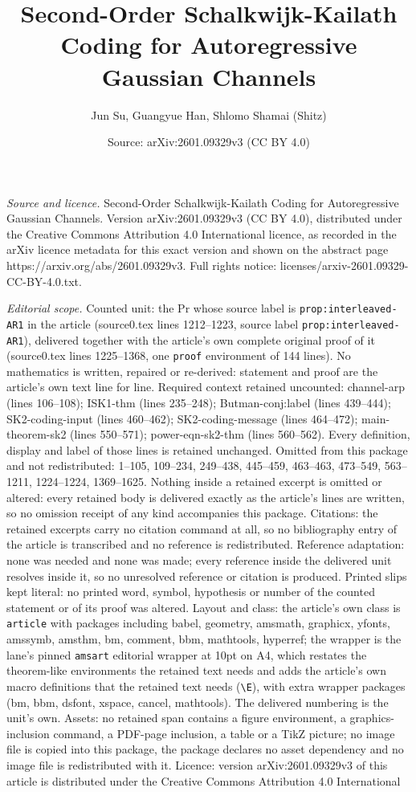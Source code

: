 \documentclass[10pt,a4paper]{amsart}
\title[Second-Order Schalkwijk-Kailath Coding for Autoregressive Ga]{Second-Order Schalkwijk-Kailath Coding for Autoregressive Gaussian Channels}
\author{Jun Su, Guangyue Han, Shlomo Shamai (Shitz)}
\date{Source: arXiv:2601.09329v3 (CC BY 4.0)}
\begin{document}
\maketitle

\noindent\emph{Source and licence.} Second-Order Schalkwijk-Kailath Coding for Autoregressive Gaussian Channels. Version arXiv:2601.09329v3 (CC BY 4.0), distributed under the Creative Commons Attribution 4.0 International licence, as recorded in the arXiv licence metadata for this exact version and shown on the abstract page https://arxiv.org/abs/2601.09329v3. Full rights notice: licenses/arxiv-2601.09329-CC-BY-4.0.txt.\par\smallskip

\noindent\textit{Editorial scope.} Counted unit: the Pr whose source label is \texttt{prop:interleaved-AR1} in the article (source0.tex lines 1212--1223, source label \texttt{prop:interleaved-AR1}), delivered together with the article's own complete original proof of it (source0.tex lines 1225--1368, one \texttt{proof} environment of 144 lines). No mathematics is written, repaired or re-derived: statement and proof are the article's own text line for line. Required context retained uncounted: channel-arp (lines 106--108); ISK1-thm (lines 235--248); Butman-conj:label (lines 439--444); SK2-coding-input (lines 460--462); SK2-coding-message (lines 464--472); main-theorem-sk2 (lines 550--571); power-eqn-sk2-thm (lines 560--562). Every definition, display and label of those lines is retained unchanged. Omitted from this package and not redistributed: 1--105, 109--234, 249--438, 445--459, 463--463, 473--549, 563--1211, 1224--1224, 1369--1625. Nothing inside a retained excerpt is omitted or altered: every retained body is delivered exactly as the article's lines are written, so no omission receipt of any kind accompanies this package. Citations: the retained excerpts carry no citation command at all, so no bibliography entry of the article is transcribed and no reference is redistributed. Reference adaptation: none was needed and none was made; every reference inside the delivered unit resolves inside it, so no unresolved reference or citation is produced. Printed slips kept literal: no printed word, symbol, hypothesis or number of the counted statement or of its proof was altered. Layout and class: the article's own class is \texttt{article} with packages including babel, geometry, amsmath, graphicx, yfonts, amssymb, amsthm, bm, comment, bbm, mathtools, hyperref; the wrapper is the lane's pinned \texttt{amsart} editorial wrapper at 10pt on A4, which restates the theorem-like environments the retained text needs and adds the article's own macro definitions that the retained text needs (\texttt{\textbackslash E}), with extra wrapper packages (bm, bbm, dsfont, xspace, cancel, mathtools). The delivered numbering is the unit's own. Assets: no retained span contains a figure environment, a graphics-inclusion command, a PDF-page inclusion, a table or a TikZ picture; no image file is copied into this package, the package declares no asset dependency and no image file is redistributed with it. Licence: version arXiv:2601.09329v3 of this article is distributed under the Creative Commons Attribution 4.0 International 
\end{document}
